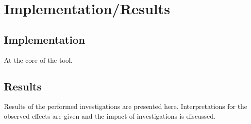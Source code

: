 \chapter{Implementation/Results}
\section{Implementation}
At the core of the tool.

\section{Results}
Results of the performed investigations are presented here. Interpretations for the observed effects are given and the impact of investigations is discussed. 
